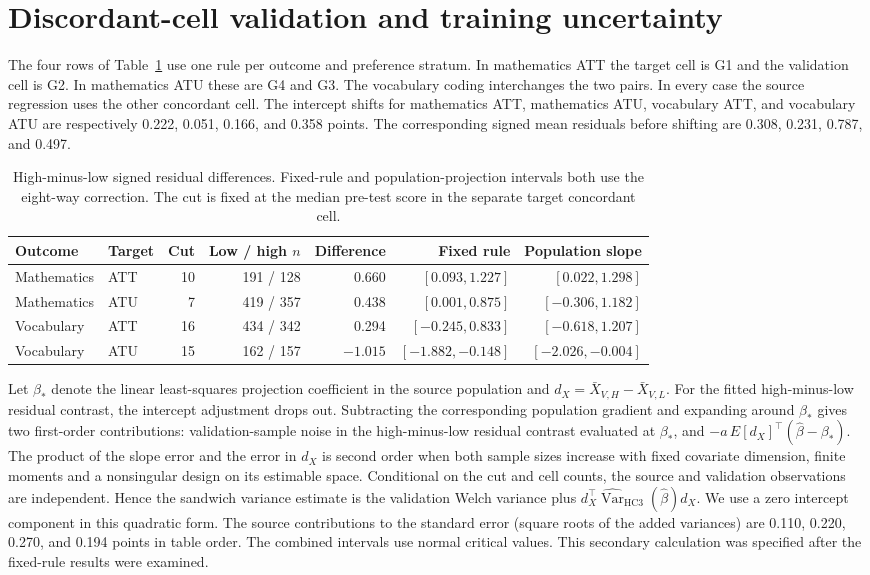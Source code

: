 \section{Discordant-cell validation and training uncertainty}
\label{sec:audit-supp}

The four rows of Table~\ref{tab:gradients} use one rule per outcome and preference stratum. In mathematics ATT the target cell is G1 and the validation cell is G2. In mathematics ATU these are G4 and G3. The vocabulary coding interchanges the two pairs. In every case the source regression uses the other concordant cell. The intercept shifts for mathematics ATT, mathematics ATU, vocabulary ATT, and vocabulary ATU are respectively 0.222, 0.051, 0.166, and 0.358 points. The corresponding signed mean residuals before shifting are 0.308, 0.231, 0.787, and 0.497.

\begin{table}[htbp]
\centering\small
\caption{High-minus-low signed residual differences. Fixed-rule and population-projection intervals both use the eight-way correction. The cut is fixed at the median pre-test score in the separate target concordant cell.}
\label{tab:gradients}\setlength{\tabcolsep}{3.5pt}
\begin{tabular}{llrrrrr}
\toprule
Outcome & Target & Cut & Low / high $n$ & Difference & Fixed rule & Population slope \\
\midrule
Mathematics & ATT & 10 & 191 / 128 & 0.660 & $[0.093,1.227]$ & $[0.022,1.298]$ \\
Mathematics & ATU & 7 & 419 / 357 & 0.438 & $[0.001,0.875]$ & $[-0.306,1.182]$ \\
Vocabulary & ATT & 16 & 434 / 342 & 0.294 & $[-0.245,0.833]$ & $[-0.618,1.207]$ \\
Vocabulary & ATU & 15 & 162 / 157 & $-1.015$ & $[-1.882,-0.148]$ & $[-2.026,-0.004]$ \\
\bottomrule
\end{tabular}
\end{table}

Let $\beta_*$ denote the linear least-squares projection coefficient in the source population and $d_X=\bar X_{V,H}-\bar X_{V,L}$. For the fitted high-minus-low residual contrast, the intercept adjustment drops out. Subtracting the corresponding population gradient and expanding around $\beta_*$ gives two first-order contributions: validation-sample noise in the high-minus-low residual contrast evaluated at $\beta_*$, and $-a\,E[d_X]^\top(\widehat\beta-\beta_*)$. The product of the slope error and the error in $d_X$ is second order when both sample sizes increase with fixed covariate dimension, finite moments and a nonsingular design on its estimable space. Conditional on the cut and cell counts, the source and validation observations are independent. Hence the sandwich variance estimate is the validation Welch variance plus $d_X^\top\widehat{\operatorname{Var}}_{\mathrm{HC3}}(\widehat\beta)d_X$. We use a zero intercept component in this quadratic form. The source contributions to the standard error (square roots of the added variances) are 0.110, 0.220, 0.270, and 0.194 points in table order. The combined intervals use normal critical values. This secondary calculation was specified after the fixed-rule results were examined.

